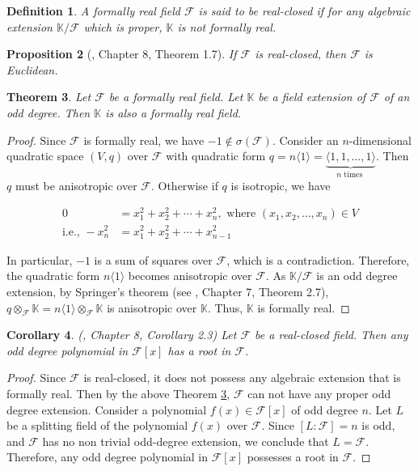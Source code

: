 \documentclass[sn-mathphys-num]{sn-jnl}%
\newtheorem{theorem}{Theorem}[section]
\newtheorem{corollary}[theorem]{Corollary}
\newtheorem{definition}[theorem]{Definition}
\newtheorem{proposition}[theorem]{Proposition}
\begin{document}
\begin{definition}
A formally real field $\mathcal F$ is said to be {\it real-closed} if for any algebraic extension $\mathbb K/\mathcal F$ which is proper, $\mathbb K$ is not formally real.
    
\end{definition}
\medskip 


\begin{proposition}[\cite{lam}, Chapter 8, Theorem 1.7]\label{real closed is Euclidean}
    If $\mathcal F$ is real-closed, then $\mathcal F$ is Euclidean.
\end{proposition}
\medskip

\begin{theorem}
\label{odd extension is formally real}
Let $\mathcal F$ be a formally real field. Let $\mathbb K$ be a field extension of $\mathcal F$ of an odd degree. Then $\mathbb K$ is also a formally real field.    
\end{theorem} 
\begin{proof}
Since $\mathcal F$ is formally real, we have $-1 \notin \sigma(\mathcal F)$. Consider an $n$-dimensional quadratic space $(V,q)$ over $\mathcal F$ with quadratic form $q=n \langle 1 \rangle= \underbrace {\langle 1,1, \dots, 1 \rangle}_{n\text{ times }}$. Then $q$ must be anisotropic over $\mathcal F$. Otherwise if $q$ is isotropic, we have 
  
\begin{align*}
     0&=x_1^2+x_2^2+\cdots +x_n^2, \text{ where } (x_1,x_2,\dots , x_n) \in V\\
     \text {i.e., }  -x_n^2&=x_1^2+x_2^2+\cdots +x_{n-1}^2
\end{align*}
    
    In particular, $-1$ is a sum of squares over $\mathcal F$, which is a contradiction. Therefore, the quadratic form $n \langle 1 \rangle$ becomes anisotropic over $\mathcal F$. 
    As $\mathbb K/\mathcal F$ is an odd degree extension, by Springer's theorem (see \cite{lam}, Chapter 7, Theorem 2.7), $ q \otimes_\mathcal F \mathbb K= n\langle 1 \rangle \otimes_\mathcal F \mathbb K $ is anisotropic over $\mathbb K$. Thus, $\mathbb K$ is formally real. 
\end{proof}
\begin{corollary} (\cite{lam}, Chapter 8, Corollary 2.3)
    Let $\mathcal F$ be a real-closed field. Then any odd degree polynomial in $\mathcal F[x]$ has a root in $\mathcal F$. 
\end{corollary}
\begin{proof}
    Since $\mathcal F$ is real-closed, it does not possess any algebraic extension that is formally real. Then by the above Theorem \ref{odd extension is formally real}, $\mathcal F$ can not have any proper odd degree extension.
 Consider a polynomial $f(x) \in \mathcal F[x]$ of odd degree $n$. Let $L$ be a splitting field of the polynomial $f(x)$ over $\mathcal F$. Since $[L:\mathcal F]=n$ is odd, and $\mathcal F$ has no non trivial odd-degree extension, we conclude that $L=\mathcal F$. Therefore, any odd degree polynomial in $ \mathcal F[x]$ possesses a root in $\mathcal F$.


\end{proof}
\end{document}
